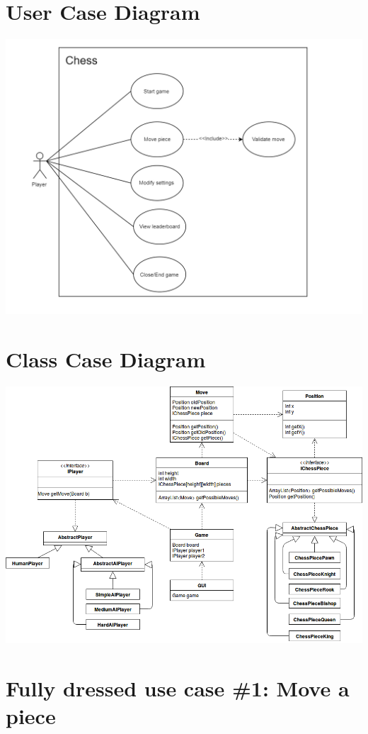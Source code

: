\documentclass{article}
\begin{document}
\section*{User Case Diagram}
\includegraphics[width=15cm]{usecasediagram}

\section*{Class Case Diagram}
\includegraphics[width=15cm]{classdiagram}

\section*{Fully dressed use case \#1: Move a piece}
\end{document}
